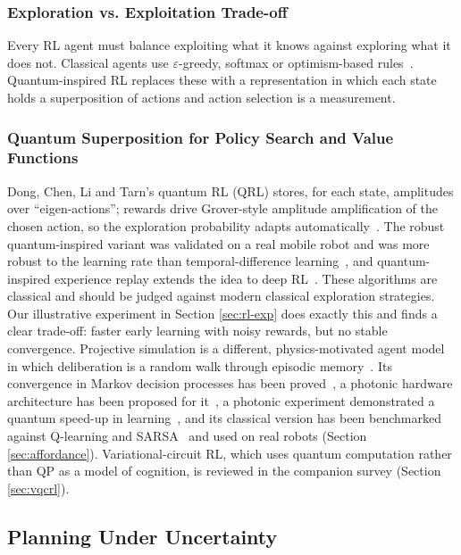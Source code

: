 \documentclass[pdflatex,sn-basic]{sn-jnl}
\begin{document}
\subsubsection{Exploration vs. Exploitation Trade-off}
Every RL agent must balance exploiting what it knows against exploring what it does not. Classical agents use $\varepsilon$-greedy, softmax or optimism-based rules~\citep{Sutton2018}. Quantum-inspired RL replaces these with a representation in which each state holds a superposition of actions and action selection is a measurement.

\subsubsection{Quantum Superposition for Policy Search and Value Functions}
Dong, Chen, Li and Tarn's quantum RL (QRL) stores, for each state, amplitudes over ``eigen-actions''; rewards drive Grover-style amplitude amplification of the chosen action, so the exploration probability adapts automatically~\citep{Dong2008}. The robust quantum-inspired variant was validated on a real mobile robot and was more robust to the learning rate than temporal-difference learning~\citep{Dong2012}, and quantum-inspired experience replay extends the idea to deep RL~\citep{Wei2022}. These algorithms are classical and should be judged against modern classical exploration strategies. Our illustrative experiment in Section \ref{sec:rl-exp} does exactly this and finds a clear trade-off: faster early learning with noisy rewards, but no stable convergence. Projective simulation is a different, physics-motivated agent model in which deliberation is a random walk through episodic memory~\citep{Briegel2012}. Its convergence in Markov decision processes has been proved~\citep{Boyajian2020}, a photonic hardware architecture has been proposed for it~\citep{Flamini2020}, a photonic experiment demonstrated a quantum speed-up in learning~\citep{Saggio2021}, and its classical version has been benchmarked against Q-learning and SARSA~\citep{Melnikov2018} and used on real robots (Section \ref{sec:affordance}). Variational-circuit RL, which uses quantum computation rather than QP as a model of cognition, is reviewed in the companion survey (Section \ref{sec:vqcrl}).

\subsection{Planning Under Uncertainty}\label{sec:planning}
\end{document}
